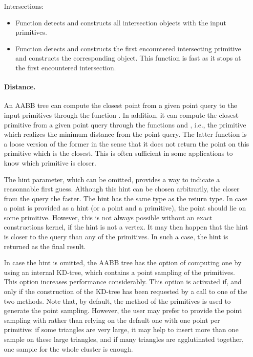 Intersections:
\begin{itemize}
\item Function  detects and constructs all intersection objects with the input primitives.
\item Function  detects and constructs the first encountered intersecting primitive and constructs the corresponding object. This function is fast as it stops at the first encountered intersection.
\end{itemize}

\paragraph{Distance.} An AABB tree can compute the closest point from a given point query to the input primitives through the function . In addition, it can compute the closest primitive from a given point query through the functions  and , i.e., the primitive which realizes the minimum distance from the point query. The latter function is a loose version of the former in the sense that it does not return the point on this primitive which is the closest. This is often sufficient in some applications to know which primitive is closer. 

The hint parameter, which can be omitted, provides a way to indicate a reasonnable first guess. Although this hint can be chosen arbitrarily, the closer from the query the faster. The hint has the same type as the return type. In case a point is provided as a hint (or a point and a primitive), the point should lie on some primitive. However, this is not always possible without an exact constructions kernel, if the hint is not a vertex. It may then happen that the hint is closer to the query than any of the primitives. In such a case, the hint is returned as the final result. 

In case the hint is omitted, the AABB tree has the option of computing one by using an internal KD-tree, which contains a point sampling of the primitives. This option increases performance considerably. This option is activated if, and only if the construction of the KD-tree has been requested by a call to one of the two  methods. Note that, by default, the method  of the primitives is used to generate the point sampling. However, the user may prefer to provide the point sampling with  rather than relying on the default one with one point per primitive: if some triangles are very large, it may help to insert more than one sample on these large triangles, and if many triangles are agglutinated together, one sample for the whole cluster is enough.